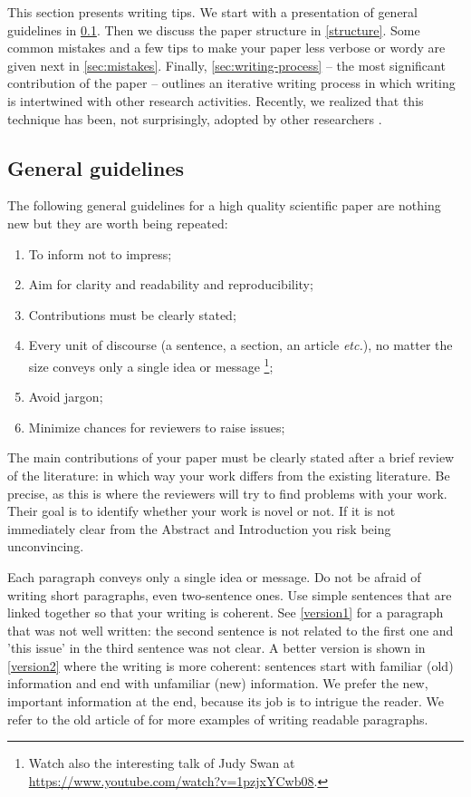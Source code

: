 \documentclass[authoryear,3p,times,preprint,review,fleqn]{elsarticle}
\makeatletter
\newcommand{\etc}{\textit{etc.}\@\xspace}
\numberwithin{equation}{section}
\theoremstyle{remark}
\makeatother
\begin{document}
This section presents  writing tips. We start with a presentation of general guidelines in \cref{sec:guidelines}. Then we  discuss the paper structure in \cref{structure}. Some common mistakes and a few tips to make your paper less verbose or wordy are given next in 
\cref{sec:mistakes}.  Finally, \cref{sec:writing-process} -- the most significant contribution of the paper -- outlines an iterative writing process in which writing is intertwined with other research activities. Recently, we realized that this technique has been, not surprisingly, adopted by other researchers \citep{Jones}.

\subsection{General guidelines}\label{sec:guidelines}

The following general guidelines for a high quality scientific paper are nothing new but they are worth being repeated:

\begin{enumerate}
\item To inform not to impress;
\item Aim for clarity and readability and  reproducibility;
\item Contributions must be clearly stated;
\item Every unit of discourse (a sentence, a section, an article \etc), no matter the size conveys only a single idea or message \citep{gopen1990science}\footnote{Watch also the interesting talk of Judy Swan at \url{https://www.youtube.com/watch?v=1pzjxYCwb08}.};
\item Avoid jargon;%
\item Minimize chances for reviewers to raise issues;
\end{enumerate}

The main contributions of your paper must be clearly stated after a brief review of the literature: in which way your work differs from the existing literature. Be precise, as this is where the reviewers will try to find problems with your work. Their goal is to identify whether your work is novel or not. If it is not immediately clear from the Abstract and Introduction you risk being unconvincing. 

Each paragraph conveys only a single idea or message. Do not be afraid of writing short paragraphs, even two-sentence ones. 
Use simple sentences that are linked together so that your writing is coherent. 
See \cref{version1} for a paragraph that was not well written: the second sentence is not related to the first one and 'this issue' in the third sentence was not clear. A better version is shown in \cref{version2} where the writing is more coherent: sentences start with familiar (old) information and end with unfamiliar (new) information. We prefer the new, important information at the end, because its job is to intrigue the reader. We refer to the old article of \cite{gopen1990science} for more examples of writing readable paragraphs.
\end{document}
